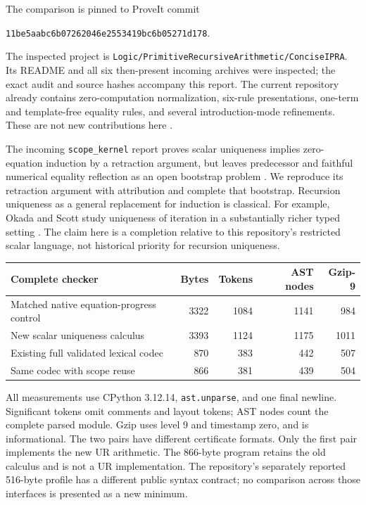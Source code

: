 \documentclass[11pt]{article}
\theoremstyle{definition}\newtheorem{definition}[theorem]{Definition}
\newcommand{\file}[1]{{\small\nolinkurl{#1}}}
\begin{document}
The comparison is pinned to ProveIt commit
\begin{center}\small\texttt{11be5aabc6b07262046e2553419bc6b05271d178}.\end{center}
The inspected project is
\file{Logic/PrimitiveRecursiveArithmetic/ConciseIPRA}.
Its README and all six then-present incoming archives were inspected;
the exact audit and source hashes accompany this report.  The current
repository already contains zero-computation normalization, six-rule
presentations, one-term and template-free equality rules, and several
introduction-mode refinements.  These are not new contributions here
\cite{project,zero-normal,template-free}.

The incoming \texttt{scope\_kernel} report proves scalar uniqueness implies
zero-equation induction by a retraction argument, but leaves predecessor
and faithful numerical equality reflection as an open bootstrap problem
\cite{scope}.  We reproduce its retraction argument with attribution and
complete that bootstrap.  Recursion uniqueness as a general replacement
for induction is classical.  For example, Okada and Scott study uniqueness
of iteration in a substantially richer typed setting \cite{okada-scott}.
The claim here is a completion relative to this repository's restricted
scalar language, not historical priority for recursion uniqueness.

\begin{center}
\begin{tabular}{@{}lrrrr@{}}
\toprule
Complete checker & Bytes & Tokens & AST nodes & Gzip-9\\
\midrule
Matched native equation-progress control & 3322 & 1084 & 1141 & 984\\
New scalar uniqueness calculus & 3393 & 1124 & 1175 & 1011\\
Existing full validated lexical codec & 870 & 383 & 442 & 507\\
Same codec with scope reuse & 866 & 381 & 439 & 504\\
\bottomrule
\end{tabular}
\end{center}
All measurements use CPython 3.12.14, \texttt{ast.unparse}, and one final
newline.  Significant tokens omit comments and layout tokens; AST nodes
count the complete parsed module.  Gzip uses level 9 and timestamp zero,
and is informational.  The two pairs have different certificate formats.
Only the first pair implements the new UR arithmetic.  The 866-byte
program retains the old calculus and is not a UR implementation.  The
repository's separately reported 516-byte profile has a different public
syntax contract; no comparison across those interfaces is presented as a
new minimum.
\end{document}

